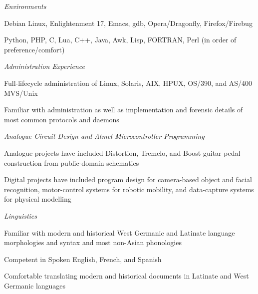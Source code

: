 \documentclass[margin,line]{resume}
\begin{document}
\begin{resume}
    \textsl{Environments}\vspace{-4mm}\\%
    \begin{list2}
        \item Debian Linux, Enlightenment 17, Emacs, gdb, Opera/Dragonfly, Firefox/Firebug
        \item Python, PHP, C, Lua, C++, Java, Awk, Lisp, FORTRAN, Perl (in order of preference/comfort)
    \end{list2}

    \textsl{Administration Experience}\vspace{-4mm}\\%
    \begin{list2}
        \item Full-lifecycle administration of Linux, Solaris, AIX, HPUX, OS/390, and AS/400 MVS/Unix
        \item Familiar with administration as well as implementation and forensic details of most common protocols and daemons
    \end{list2}

    \textsl{Analogue Circuit Design and Atmel Microcontroller Programming}\vspace{-4mm}\\%
    \begin{list2}
        \item Analogue projects have included Distortion, Tremelo, and Boost guitar pedal construction from public-domain schematics
        \item Digital projects have included program design for camera-based object and facial recognition, motor-control
              systems for robotic mobility, and data-capture systems for physical modelling
    \end{list2}

    \textsl{Linguistics}\vspace{-4mm}\\%
    \begin{list2}
        \item Familiar with modern and historical West Germanic and Latinate language morphologies and syntax and most non-Asian phonologies
        \item Competent in Spoken English, French, and Spanish
        \item Comfortable translating modern and historical documents in Latinate and West Germanic languages
    \end{list2}


\end{resume}
\end{document}
